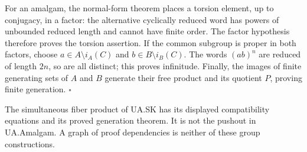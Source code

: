 For an amalgam, the normal-form theorem places a torsion element, up to
conjugacy, in a factor: the alternative cyclically reduced word has
powers of unbounded reduced length and cannot have finite order. The
factor hypothesis therefore proves the torsion assertion. If the common
subgroup is proper in both factors, choose \(a\in A\setminus i_A(C)\)
and \(b\in B\setminus i_B(C)\). The words \((ab)^n\) are reduced of
length \(2n\), so are all distinct; this proves infinitude. Finally, the
images of finite generating sets of \(A\) and \(B\) generate their free
product and its quotient \(P\), proving finite generation. \(\square\)

The simultaneous fiber product of UA.SK has its displayed compatibility
equations and its proved generation theorem. It is not the pushout in
UA.Amalgam. A graph of proof dependencies is neither of these group
constructions.
